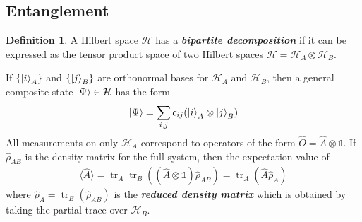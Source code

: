 \documentclass[11pt, answers]{exam}
\newcommand{\avg}[1]{\langle {#1} \rangle}
\theoremstyle{definition}
\newtheorem{definition}{\underline{Definition}}[section]
\theoremstyle{bulleted}
\begin{document}
	\subsection{Entanglement}
	\begin{definition}
		A Hilbert space $\mathcal{H}$ has a \textit{\textbf{bipartite decomposition}} if it can be expressed as the tensor product space of two Hilbert spaces $\mathcal{H} = \mathcal{H}_A \otimes \mathcal{H}_B$.
	\end{definition}
	If $\{\ket{i}_A\}$ and $\{\ket{j}_B\}$ are orthonormal bases for $\mathcal{H}_A$ and $\mathcal{H}_B$, then a general composite state $\ket{\Psi}\in\mathcal{H}$ has the form
	\begin{align*}
		\ket{\Psi} = \sum_{i,j} c_{ij}(\ket{i}_A \otimes \ket{j}_B)
	\end{align*}
	All measurements on only $\mathcal{H}_A$ correspond to operators of the form $\hat{O} = \hat{A}\otimes \mathds{1}$. If $\hat{\rho}_{AB}$ is the density matrix for the full system, then the expectation value of
	\begin{align*}
		\avg{\hat{A}} = \operatorname{tr}_A\operatorname{tr}_B\left((\hat{A}\otimes\mathds{1})\hat{\rho}_{AB}\right) = \operatorname{tr}_A(\hat{A}\hat{\rho}_A)
	\end{align*}
	where $\hat{\rho}_A = \operatorname{tr}_B(\hat{\rho}_{AB})$ is the \textit{\textbf{reduced density matrix}} which is obtained by taking the partial trace over $\mathcal{H}_B$.
	
\end{document}
